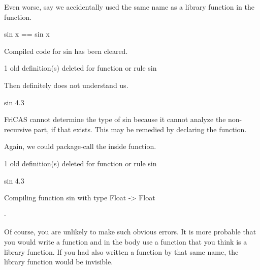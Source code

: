 \begin{xtc}
\begin{xtccomment}
Even worse, say we accidentally used the same name as a library
function in the function.
\end{xtccomment}
\begin{spadsrc}
sin x == sin x 
\end{spadsrc}
\begin{MessageOutput}
   Compiled code for sin has been cleared.
\end{MessageOutput}
\begin{MessageOutput}
   1 old definition(s) deleted for function or rule sin 
\end{MessageOutput}
\end{xtc}
\begin{xtc}
\begin{xtccomment}
Then \Language{} definitely does not understand us.
\end{xtccomment}
\begin{spadsrc}
sin 4.3 
\end{spadsrc}
\begin{MessageOutput}
   FriCAS cannot determine the type of sin because it cannot analyze 
      the non-recursive part, if that exists. This may be remedied by 
      declaring the function.
\end{MessageOutput}
\end{xtc}
\begin{xtc}
\begin{xtccomment}
Again, we could package-call the inside function.
\end{xtccomment}
\begin{MessageOutput}
   1 old definition(s) deleted for function or rule sin 
\end{MessageOutput}
\end{xtc}
\begin{xtc}
\begin{xtccomment}
\end{xtccomment}
\begin{spadsrc}
sin 4.3 
\end{spadsrc}
\begin{MessageOutput}
   Compiling function sin with type Float -> Float 
\end{MessageOutput}
\begin{TeXOutput}
\begin{fricasmath}{7}
-{}%
\end{fricasmath}
\end{TeXOutput}
\end{xtc}
Of course, you are unlikely to make such obvious errors.
It is more probable that you would write a function and in the body use a
function that you think is a library function.
If you had also written a function by that same name, the library function
would be invisible.

